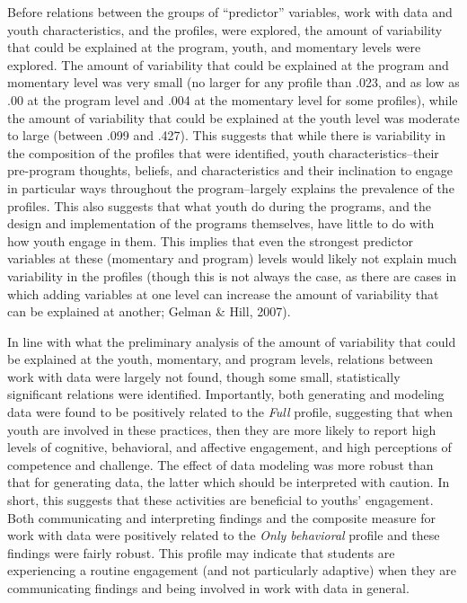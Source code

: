 \documentclass[]{msu-thesis}
\theoremstyle{definition}
\theoremstyle{definition}
\theoremstyle{definition}
\theoremstyle{remark}
\begin{document}
Before relations between the groups of ``predictor'' variables, work
with data and youth characteristics, and the profiles, were explored,
the amount of variability that could be explained at the program, youth,
and momentary levels were explored. The amount of variability that could
be explained at the program and momentary level was very small (no
larger for any profile than .023, and as low as .00 at the program level
and .004 at the momentary level for some profiles), while the amount of
variability that could be explained at the youth level was moderate to
large (between .099 and .427). This suggests that while there is
variability in the composition of the profiles that were identified,
youth characteristics--their pre-program thoughts, beliefs, and
characteristics and their inclination to engage in particular ways
throughout the program--largely explains the prevalence of the profiles.
This also suggests that what youth do during the programs, and the
design and implementation of the programs themselves, have little to do
with how youth engage in them. This implies that even the strongest
predictor variables at these (momentary and program) levels would likely
not explain much variability in the profiles (though this is not always
the case, as there are cases in which adding variables at one level can
increase the amount of variability that can be explained at another;
Gelman \& Hill, 2007).

In line with what the preliminary analysis of the amount of variability
that could be explained at the youth, momentary, and program levels,
relations between work with data were largely not found, though some
small, statistically significant relations were identified. Importantly,
both generating and modeling data were found to be positively related to
the \emph{Full} profile, suggesting that when youth are involved in
these practices, then they are more likely to report high levels of
cognitive, behavioral, and affective engagement, and high perceptions of
competence and challenge. The effect of data modeling was more robust
than that for generating data, the latter which should be interpreted
with caution. In short, this suggests that these activities are
beneficial to youths' engagement. Both communicating and interpreting
findings and the composite measure for work with data were positively
related to the \emph{Only behavioral} profile and these findings were
fairly robust. This profile may indicate that students are experiencing
a routine engagement (and not particularly adaptive) when they are
communicating findings and being involved in work with data in general.
\end{document}
